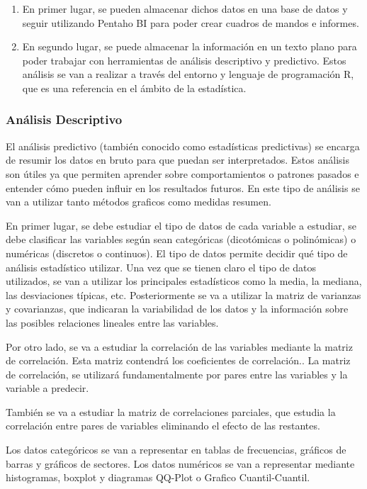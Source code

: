 \begin{enumerate}
\item  En primer lugar, se pueden almacenar dichos datos en una base de datos y seguir utilizando Pentaho BI para poder crear cuadros de mandos e informes. 
\item  En segundo lugar, se puede almacenar la información en un texto plano para poder trabajar con herramientas de análisis descriptivo y predictivo. Estos análisis se van a realizar a través del entorno y lenguaje de programación R, que es una referencia en el ámbito de la estadística.
\end{enumerate}


\subsubsection{Análisis Descriptivo}

El análisis predictivo (también conocido como estadísticas predictivas) se encarga de resumir los datos en bruto para que puedan ser interpretados. Estos análisis son útiles ya que permiten aprender sobre comportamientos o patrones pasados e entender cómo pueden influir en los resultados futuros. En este tipo de análisis se van a utilizar tanto métodos graficos como medidas resumen.

En primer lugar, se debe estudiar el tipo de datos de cada variable a estudiar, se debe clasificar las variables según sean categóricas (dicotómicas o polinómicas) o numéricas (discretos o continuos). El tipo de datos permite decidir qué tipo de análisis estadístico utilizar.
Una vez que se tienen claro el tipo de datos utilizados, se van a utilizar los principales estadísticos como la media, la mediana, las desviaciones típicas, etc.
Posteriormente se va a utilizar la matriz de varianzas y covarianzas, que indicaran la variabilidad de los datos y la información sobre las posibles relaciones lineales entre las variables. 

Por otro lado, se va a estudiar la correlación de las variables mediante la matriz de correlación. Esta matriz contendrá los coeficientes de correlación.\cite{JMMarin}. La matriz de correlación, se utilizará fundamentalmente por pares entre las variables y la variable a predecir.

También se va a estudiar la matriz de correlaciones parciales, que estudia la correlación entre pares de variables eliminando el efecto de las restantes.\cite{JMMarin}

Los datos categóricos se van a representar en tablas de frecuencias, gráficos de barras y gráficos de sectores. Los datos numéricos se van a representar mediante histogramas, boxplot y diagramas QQ-Plot o Grafico Cuantil-Cuantil. \cite{Orellana2001}

